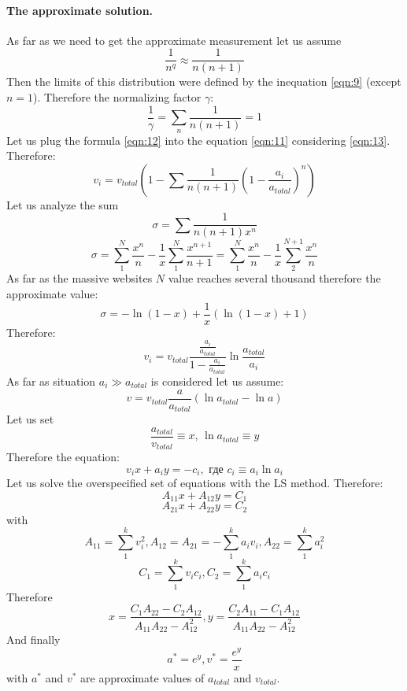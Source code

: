 \paragraph{The approximate solution.} As far as we need to get the approximate measurement let us assume
\begin{equation}
	\label{eqn:12}
	\frac{1}{n^q} \approx \frac{1}{n(n+1)}
\end{equation}
Then the limits of this distribution were defined by the inequation \cref{eqn:9} (except \(n = 1\)). Therefore the normalizing factor \(\gamma\):
\begin{equation}
	\label{eqn:13}
	\frac{1}{\gamma} = \sum_{n} \frac{1}{n(n+1)} = 1
\end{equation}
Let us plug the formula \cref{eqn:12} into the equation \cref{eqn:11} considering \cref{eqn:13}. Therefore:
\[
v_i = v_{total}(1 - \sum \frac{1}{n(n+1)} (1 - \frac{a_i}{a_{total}})^n)
\]
Let us analyze the sum
\[
\sigma = \sum \frac{1}{n(n+1) x^n}
\]
\[
\sigma = \sum_{1}^{N} \frac{x^n}{n} - \frac{1}{x} \sum_{1}^{N} \frac{x^{n+1}}{n + 1} = \sum_{1}^{N} \frac{x^n}{n} - \frac{1}{x} \sum_{2}^{N + 1}\frac{x^n}{n}
\]
As far as the massive websites \(N\) value reaches several thousand therefore the approximate value:
\[
\sigma = -\ln{(1 - x)} + \frac{1}{x}(\ln{(1 - x)} + 1)
\]
Therefore:
\[
v_i = v_{total} \frac{\frac{a_i}{a_{total}}}{1 - \frac{a_i}{a_{total}}} \ln{\frac{a_{total}}{a_i}}
\]
As far as situation \(a_i \gg a_{total}\) is considered let us assume:
\[
v = v_{total}\frac{a}{a_{total}} (\ln{a_{total}} - \ln{a})
\]
Let us set
\[
\frac{a_{total}}{v_{total}} \equiv x \text{, } \ln{a_{total}} \equiv y
\]
Therefore the equation:
\[
v_i x + a_i y = -c_i, \text{ где } c_i \equiv a_i \ln{a_i}
\]
Let us solve the overspecified set of equations with the LS method. Therefore:
\[
A_{11} x + A_{12} y = C_1
\]
\[
A_{21} x + A_{22} y = C_2 
\]
with
\[
A_{11} = \sum_{1}^{k} v_i^2, A_{12} = A_{21} = -\sum_{1}^{k} a_i v_i, A_{22} = \sum_{1}^{k} a_i^2
\]
\begin{equation}
	\label{eqn:14}
	C_1 = \sum_{1}^{k} v_i c_i, C_2 = \sum_{1}^{k} a_i c_i
\end{equation}
Therefore
\begin{equation}
	\label{eqn:15}
	x = \frac{C_1 A_{22} - C_2 A_{12}}{A_{11} A_{22} - A^2_{12}}, y = \frac{C_2 A_{11} - C_1 A_{12}}{A_{11} A_{22} - A^2_{12}}
\end{equation}
And finally
\begin{equation}
	\label{eqn:16}
	a^* = e^y, v^* = \frac{e^y}{x}
\end{equation}
with \(a^*\) and \(v^*\) are approximate values of \(a_{total}\) and \(v_{total}\).

